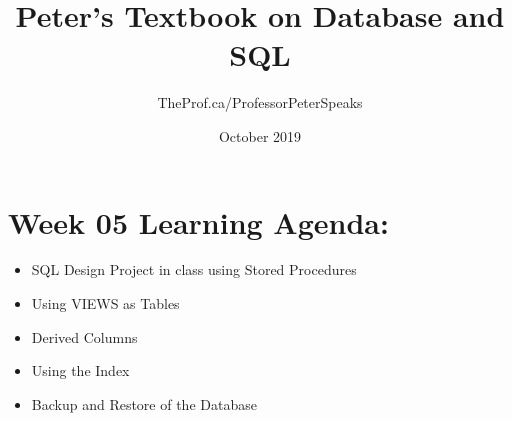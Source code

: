 \documentclass{article}
\title{Peter's Textbook on Database and SQL}
\author{TheProf.ca/ProfessorPeterSpeaks }
\date{October 2019}
\begin{document}
\maketitle
\tableofcontents

\section{Week 05 Learning Agenda:}

\begin{itemize}
    \item SQL Design Project in class using Stored Procedures
    \item Using VIEWS as Tables 
    \item Derived Columns
    \item Using the Index
    \item Backup and Restore of the Database
\end{itemize}    














\end{document}
